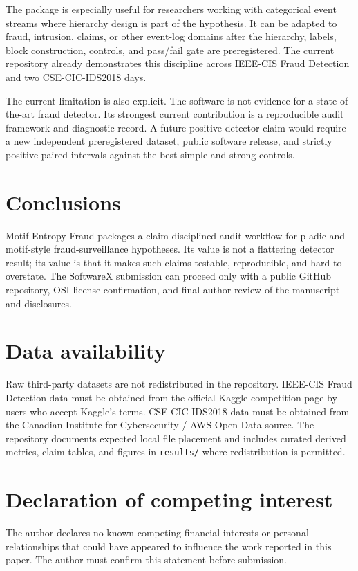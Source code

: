 \documentclass[preprint,12pt,a4paper]{elsarticle}
\begin{document}
The package is especially useful for researchers working with categorical event streams where hierarchy design is part of the hypothesis. It can be adapted to fraud, intrusion, claims, or other event-log domains after the hierarchy, labels, block construction, controls, and pass/fail gate are preregistered. The current repository already demonstrates this discipline across IEEE-CIS Fraud Detection and two CSE-CIC-IDS2018 days.

The current limitation is also explicit. The software is not evidence for a state-of-the-art fraud detector. Its strongest current contribution is a reproducible audit framework and diagnostic record. A future positive detector claim would require a new independent preregistered dataset, public software release, and strictly positive paired intervals against the best simple and strong controls.

\section{Conclusions}
Motif Entropy Fraud packages a claim-disciplined audit workflow for p-adic and motif-style fraud-surveillance hypotheses. Its value is not a flattering detector result; its value is that it makes such claims testable, reproducible, and hard to overstate. The SoftwareX submission can proceed only with a public GitHub repository, OSI license confirmation, and final author review of the manuscript and disclosures.

\section*{Data availability}
Raw third-party datasets are not redistributed in the repository. IEEE-CIS Fraud Detection data must be obtained from the official Kaggle competition page by users who accept Kaggle's terms. CSE-CIC-IDS2018 data must be obtained from the Canadian Institute for Cybersecurity / AWS Open Data source. The repository documents expected local file placement and includes curated derived metrics, claim tables, and figures in \texttt{results/} where redistribution is permitted.

\section*{Declaration of competing interest}
The author declares no known competing financial interests or personal relationships that could have appeared to influence the work reported in this paper. The author must confirm this statement before submission.
\end{document}
